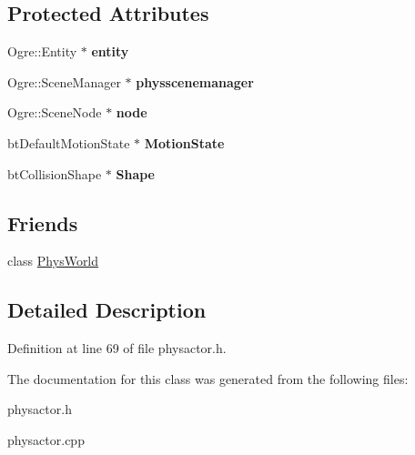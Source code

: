 \subsection*{Protected Attributes}
\begin{DoxyCompactItemize}
\item 
\hypertarget{classActorBase_ada6ceb752605b29357b6c5d53c477696}{
Ogre::Entity $\ast$ {\bfseries entity}}
\label{dd/d7b/classActorBase_ada6ceb752605b29357b6c5d53c477696}

\item 
\hypertarget{classActorBase_ad3739eb7f632f0ceb9397d6c699623cd}{
Ogre::SceneManager $\ast$ {\bfseries physscenemanager}}
\label{dd/d7b/classActorBase_ad3739eb7f632f0ceb9397d6c699623cd}

\item 
\hypertarget{classActorBase_affa8851ae622e1d420afa4770ab89ea4}{
Ogre::SceneNode $\ast$ {\bfseries node}}
\label{dd/d7b/classActorBase_affa8851ae622e1d420afa4770ab89ea4}

\item 
\hypertarget{classActorBase_a3b03d2763602bfa24af9626181bb67db}{
btDefaultMotionState $\ast$ {\bfseries MotionState}}
\label{dd/d7b/classActorBase_a3b03d2763602bfa24af9626181bb67db}

\item 
\hypertarget{classActorBase_aff0d385bc9d30cf053838fd61b32ebad}{
btCollisionShape $\ast$ {\bfseries Shape}}
\label{dd/d7b/classActorBase_aff0d385bc9d30cf053838fd61b32ebad}

\end{DoxyCompactItemize}
\subsection*{Friends}
\begin{DoxyCompactItemize}
\item 
\hypertarget{classActorBase_a375fd37c70c941f0442997a60fdb05c7}{
class \hyperlink{classActorBase_a375fd37c70c941f0442997a60fdb05c7}{PhysWorld}}
\label{dd/d7b/classActorBase_a375fd37c70c941f0442997a60fdb05c7}

\end{DoxyCompactItemize}


\subsection{Detailed Description}


Definition at line 69 of file physactor.h.

The documentation for this class was generated from the following files:\begin{DoxyCompactItemize}
\item 
physactor.h\item 
physactor.cpp\end{DoxyCompactItemize}
